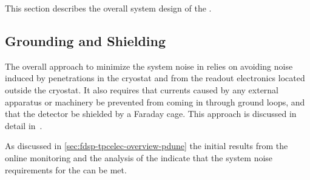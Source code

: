 This section describes the overall
system design of the .

\begin{comment}
, starting in
\ref{sec:fdsp-tpcelec-design-grounding} with a description of the
grounding and shielding scheme adopted in the \dword{dune} \dword{spmod}
to minimize the overall noise in the detector, followed in
\ref{sec:fdsp-tpcelec-design-bias} by a discussion of the bias
voltage distribution system. Later, we describe in 
\ref{sec:fdsp-tpcelec-design-femb} the \dwords{femb}, including
the design of the \dwords{asic} that are being considered for
use in \dword{dune}. In~\ref{sec:fdsp-tpcelec-design-infrastructure}
we discuss the infrastructure for the \dword{ce} inside the cryostat,
that includes the cold boxes that shield the \dwords{femb}, the
cold cables, and the cables trays. Then in
\ref{sec:fdsp-tpcelec-design-ft}-\ref{sec:fdsp-tpcelec-design-timing} we discuss 
the infrastructure on the top of the cryostat, including the
feedthroughs, the \dwords{wiec}, the timing distribution and
synchronization system, and the services that provide the low
voltage power and the bias voltage to the \dword{ce}. Finally,
we conclude in~\ref{sec:fdsp-tpcelec-overview-remaining}
with a discussion of the design maturity and of
the remaining prototype activities that are required prior to
the beginning of he detector construction. Other aspects of
the system design, pertaining to the grounding of other 
detector components, are discussed in Section~\ref{sec:fdsp-tpcelec-interfaces}.
\end{comment}
\subsection{Grounding and Shielding}
\label{sec:fdsp-tpcelec-design-grounding}

The overall approach to minimize the system noise in 
relies on avoiding noise induced by penetrations in the cryostat
and from the readout electronics located outside the cryostat.
It also requires that currents caused by any external apparatus or 
machinery be prevented from coming in through ground loops, and that the
detector be shielded by a Faraday cage. This approach is discussed 
in detail in~\cite{radekaNoise}. 

As discussed in \ref{sec:fdsp-tpcelec-overview-pdune}
the initial results from the online monitoring and the
analysis of the  indicate that the system
noise requirements for the  
can be met.

